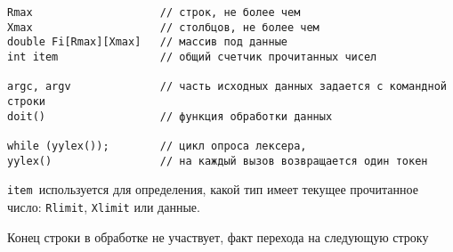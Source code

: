 
\begin{verbatim}
Rmax 					// строк, не более чем 
Xmax 					// столбцов, не более чем
double Fi[Rmax][Xmax]	// массив под данные
int item				// общий счетчик прочитанных чисел

argc, argv				// часть исходных данных задается с командной строки
doit()					// функция обработки данных

while (yylex());		// цикл опроса лексера,
yylex()					// на каждый вызов возвращается один токен
\end{verbatim}

\verb|item|\ используется для определения, какой тип имеет текущее 
прочитанное число: \verb|Rlimit|, \verb|Xlimit| или данные.

Конец строки в обработке не участвует, факт перехода на следующую строку

\secup



\secup
